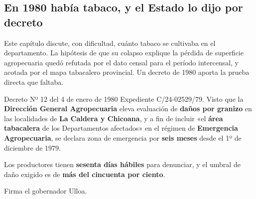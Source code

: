 \subsection*{En 1980 había tabaco, y el Estado lo dijo por decreto}

Este capítulo discute, con dificultad, cuánto tabaco se cultivaba en el departamento. La
hipótesis de que su colapso explique la pérdida de superficie agropecuaria quedó refutada por
el dato censal para el período intercensal, y acotada por el mapa tabacalero provincial. Un decreto de 1980 aporta la
prueba directa que faltaba.

\begin{ficha}{Decreto Nº 12 del 4 de enero de 1980}
Expediente C/24-02529/79. Visto que la \textbf{Dirección General Agropecuaria} eleva
evaluación de \textbf{daños por granizo} en las localidades de \textbf{La Caldera y Chicoana},
y a fin de incluir «el \textbf{área tabacalera} de los Departamentos afectados» en el régimen
de \textbf{Emergencia Agropecuaria}, se declara zona de emergencia por \textbf{seis meses}
desde el 1º de diciembre de 1979.

Los productores tienen \textbf{sesenta días hábiles} para denunciar, y el umbral de daño
exigido es de \textbf{más del cincuenta por ciento}.

Firma el gobernador Ulloa.
\end{ficha}

